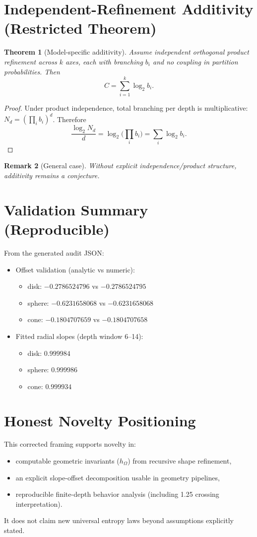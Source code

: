 \documentclass[11pt,a4paper]{article}
\newtheorem{theorem}{Theorem}[section]
\newtheorem{remark}[theorem]{Remark}
\begin{document}
\section{Independent-Refinement Additivity (Restricted Theorem)}
\begin{theorem}[Model-specific additivity]
Assume independent orthogonal product refinement across $k$ axes, each with branching
$b_i$ and no coupling in partition probabilities. Then
\[
C=\sum_{i=1}^{k}\log_2 b_i.
\]
\end{theorem}

\begin{proof}
Under product independence, total branching per depth is multiplicative:
$N_d=(\prod_i b_i)^d$. Therefore
\[
\frac{\log_2 N_d}{d}=\log_2\Big(\prod_i b_i\Big)=\sum_i \log_2 b_i.
\]
\end{proof}

\begin{remark}[General case]
Without explicit independence/product structure, additivity remains a conjecture.
\end{remark}

\section{Validation Summary (Reproducible)}
From the generated audit JSON:
\begin{itemize}
    \item Offset validation (analytic vs numeric):
    \begin{itemize}
        \item disk: $-0.2786524796$ vs $-0.2786524795$
        \item sphere: $-0.6231658068$ vs $-0.6231658068$
        \item cone: $-0.1804707659$ vs $-0.1804707658$
    \end{itemize}
    \item Fitted radial slopes (depth window 6--14):
    \begin{itemize}
        \item disk: $0.999984$
        \item sphere: $0.999986$
        \item cone: $0.999934$
    \end{itemize}
\end{itemize}

\section{Honest Novelty Positioning}
This corrected framing supports novelty in:
\begin{itemize}
    \item computable geometric invariants ($h_\Omega$) from recursive shape refinement,
    \item an explicit slope-offset decomposition usable in geometry pipelines,
    \item reproducible finite-depth behavior analysis (including 1.25 crossing interpretation).
\end{itemize}
It does not claim new universal entropy laws beyond assumptions explicitly stated.
\end{document}
